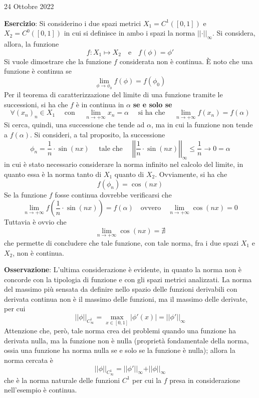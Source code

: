 \documentclass[a4paper]{extarticle}
\begin{document}
\newpage
\noindent
\begin{center}
    24 Ottobre 2022
\end{center}
\textbf{Esercizio}: Si considerino i due spazi metrici $X_1 = C^{1}([0,1])$ e $X_2 = C^0([0,1])$ in cui si definisce in ambo i spazi la norma $\vert \vert \cdot \vert \vert_{\infty}$. Si considera, allora, la funzione
\[f : X_1 \longmapsto X_2 \hspace{1em} \text{e} \hspace{1em} f(\phi) = \phi'\]
Si vuole dimostrare che la funzione $f$ considerata non è continua. È noto che una funzione è continua se
\[\lim_{\phi \to \phi_0} f(\phi) = f(\phi_0)\]
Per il teorema di caratterizzazione del limite di una funzione tramite le successioni, si ha che $f$ è in continua in $\alpha$ \textbf{se e solo se}
\[\forall (x_n)_n \in X_1 \hspace{1em} \text{ con } \hspace{1em} \lim_{n \to +\infty} x_n = \alpha \hspace{1em} \text{ si ha che } \hspace{1em} \lim_{n \to +\infty} f(x_n) = f(\alpha)\]
Si cerca, quindi, una successione che tende ad $\alpha$, ma in cui la funzione non tende a $f(\alpha)$. Si consideri, a tal proposito, la successione
\[\phi_n=\frac{1}{n} \cdot \sin(n x) \hspace{1em} \text{ tale che } \hspace{1em} \left \vert \left \vert \dfrac{1}{n} \cdot \sin(nx) \right \vert \right \vert_\infty \leq \dfrac{1}{n} \to 0 = \alpha\]
in cui è stato necessario considerare la norma infinito nel calcolo del limite, in quanto essa è la norma tanto di $X_1$ quanto di $X_2$. Ovviamente, si ha che
\[f(\phi_n)=\cos(n x)\]
Se la funzione $f$ fosse continua dovrebbe verificarsi che
\[\lim_{n \to +\infty} f \left( \frac{1}{n} \cdot \sin(nx) \right) = f(\alpha) \hspace{1em} \text{ovvero} \hspace{1em} \lim_{n \to +\infty} \cos(nx) = 0\]
Tuttavia è ovvio che
\[\lim_{n \to +\infty} \cos(nx) = \nexists\]
che permette di concludere che tale funzione, con tale norma, fra i due spazi $X_1$ e $X_2$, non è continua.

\vspace{1em}
\noindent
\textbf{Osservazione}: L'ultima considerazione è evidente, in quanto la norma non è concorde con la tipologia di funzione e con gli spazi metrici analizzati. La norma del massimo più sensata da definire nello spazio delle funzioni derivabili con derivata continua non è il massimo delle funzioni, ma il massimo delle derivate, per cui
\[\vert \vert \phi \vert \vert_{C^1_\infty} = \underset{x \in [0,1]}{\max} \vert \phi'(x) \vert = \vert \vert \phi' \vert \vert_\infty\]
Attenzione che, però, tale norma crea dei problemi quando una funzione ha derivata nulla, ma la funzione non è nulla (proprietà fondamentale della norma, ossia una funzione ha norma nulla se e solo se la funzione è nulla); allora la norma cercata è
\[\vert \vert \phi \vert \vert_{C^1_\infty} = \vert \vert \phi' \vert \vert_\infty + \vert \vert \phi \vert \vert_\infty\]
che è la norma naturale delle funzioni $C^1$ per cui la $f$ presa in considerazione nell'esempio è continua.
\end{document}
